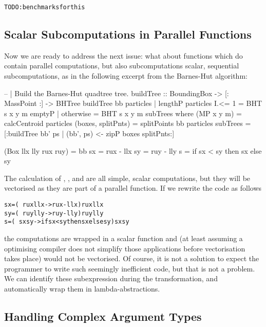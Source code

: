   \begin{alltt}
    TODO: benchmarks for this
    \end{alltt}


\subsection{Scalar Subcomputations in Parallel Functions}

    Now we are ready to address the next issue: what about functions which do contain parallel computations, but also subcomputations scalar, sequential subcomputations, as in the following
    excerpt from the Barnes-Hut algorithm:
\begin{code}
-- | Build the Barnes-Hut quadtree tree.
buildTree :: BoundingBox -> [: MassPoint :] -> BHTree
buildTree bb particles
 | lengthP particles I.<= 1 = BHT s x y m emptyP
 | otherwise                = BHT s x y m subTrees
 where  
   (MP x y m)          = calcCentroid particles
   (boxes, splitPnts)  = splitPoints bb particles 
   subTrees            = [:buildTree bb' ps | 
     (bb', ps) <- zipP boxes splitPnts:]
  
   (Box llx lly rux ruy) = bb
   sx                    = rux - llx
   sy                    = ruy - lly
   s                     = if sx < sy then sx else sy
\end{code} 
The calculation of \icode@sx@, \icode@sy@, and \icode@s@ are all simple, scalar computations, but they will be vectorised as they are part of a parallel function. If we rewrite the code as
follows
\begin{alltt}
        sx = (\ rux llx -> rux - llx) rux llx
        sy = (\ ruy lly -> ruy - lly) ruy lly
        s  = (\ sx sy -> if sx < sy then sx else sy) sx sy
\end{alltt}
the computations are wrapped in a scalar function and (at least assuming a optimising compiler does
not simplify those applications before vectorisation takes place) would not be vectorised. Of course,
it is not a solution to expect the programmer to write such seemingly inefficient code, but that is 
not a problem. We can identify these subexpression during the transformation, and automatically wrap 
them in lambda-abstractions. 


\subsection{Handling Complex Argument Types}

